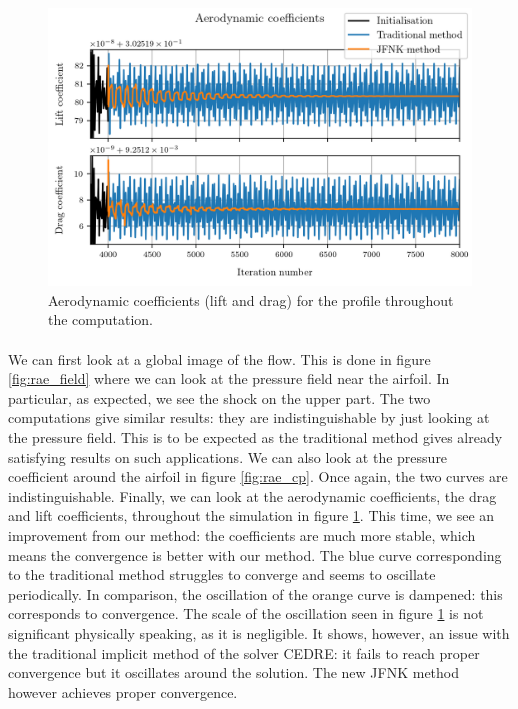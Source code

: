         \begin{figure}
          \centering
          \includegraphics{figures/rae_coefficients.png}
          \caption{Aerodynamic coefficients (lift and drag) for the profile throughout the computation.}
          \label{fig:rae_coefficients}
        \end{figure}

        \paragraph{}
        We can first look at a global image of the flow.
        This is done in figure \ref{fig:rae_field} where we can look at the pressure field near the airfoil.
        In particular, as expected, we see the shock on the upper part.
        The two computations give similar results: they are indistinguishable by just looking at the pressure field.
        This is to be expected as the traditional method gives already satisfying results on such applications.
        We can also look at the pressure coefficient around the airfoil in figure \ref{fig:rae_cp}.
        Once again, the two curves are indistinguishable.
        Finally, we can look at the aerodynamic coefficients, the drag and lift coefficients, throughout the simulation in figure \ref{fig:rae_coefficients}.
        This time, we see an improvement from our method: the coefficients are much more stable, which means the convergence is better with our method.
        The blue curve corresponding to the traditional method struggles to converge and seems to oscillate periodically.
        In comparison, the oscillation of the orange curve is dampened: this corresponds to convergence.
        The scale of the oscillation seen in figure \ref{fig:rae_coefficients} is not significant physically speaking, as it is negligible.
        It shows, however, an issue with the traditional implicit method of the solver CEDRE: it fails to reach proper convergence but it oscillates around the solution.
        The new JFNK method however achieves proper convergence.

